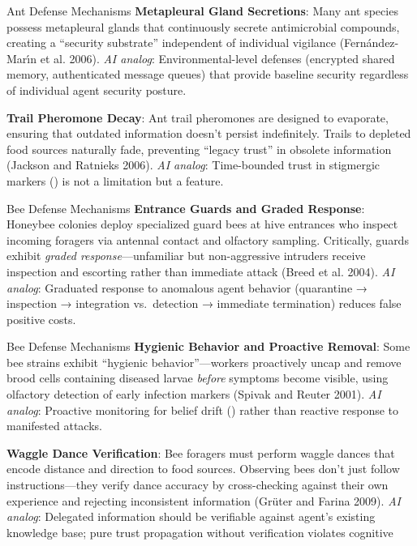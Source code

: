\documentclass[
  ignorenonframetext,
]{beamer}
\providecommand{\cref}[1]{\texttt{\detokenize{#1}}}
\begin{document}
\begin{frame}[allowframebreaks]{Ant Defense Mechanisms}
\textbf{Metapleural Gland Secretions}: Many ant species possess
metapleural glands that continuously secrete antimicrobial compounds,
creating a ``security substrate'' independent of individual vigilance
(Fernández-Marı́n et al. 2006). \emph{AI analog}: Environmental-level
defenses (encrypted shared memory, authenticated message queues) that
provide baseline security regardless of individual agent security
posture.

\textbf{Trail Pheromone Decay}: Ant trail pheromones are designed to
evaporate, ensuring that outdated information doesn't persist
indefinitely. Trails to depleted food sources naturally fade, preventing
``legacy trust'' in obsolete information (Jackson and Ratnieks 2006).
\emph{AI analog}: Time-bounded trust in stigmergic markers
(\cref{eq:colonial-trust}) is not a limitation but a feature.
\end{frame}

\begin{frame}[allowframebreaks]{Bee Defense Mechanisms}
\protect{}\label{sec:bee-defenses}
\textbf{Entrance Guards and Graded Response}: Honeybee colonies deploy
specialized guard bees at hive entrances who inspect incoming foragers
via antennal contact and olfactory sampling. Critically, guards exhibit
\emph{graded response}---unfamiliar but non-aggressive intruders receive
inspection and escorting rather than immediate attack (Breed et al.
2004). \emph{AI analog}: Graduated response to anomalous agent behavior
(quarantine → inspection → integration vs.~detection → immediate
termination) reduces false positive costs.

\end{frame}

\begin{frame}[allowframebreaks]{Bee Defense Mechanisms}
\textbf{Hygienic Behavior and Proactive Removal}: Some bee strains
exhibit ``hygienic behavior''---workers proactively uncap and remove
brood cells containing diseased larvae \emph{before} symptoms become
visible, using olfactory detection of early infection markers (Spivak
and Reuter 2001). \emph{AI analog}: Proactive monitoring for belief
drift (\cref{def:tripwire-alert}) rather than reactive response to
manifested attacks.

\textbf{Waggle Dance Verification}: Bee foragers must perform waggle
dances that encode distance and direction to food sources. Observing
bees don't just follow instructions---they verify dance accuracy by
cross-checking against their own experience and rejecting inconsistent
information (Grüter and Farina 2009). \emph{AI analog}: Delegated
information should be verifiable against agent's existing knowledge
base; pure trust propagation without verification violates cognitive
\end{frame}
\end{document}
